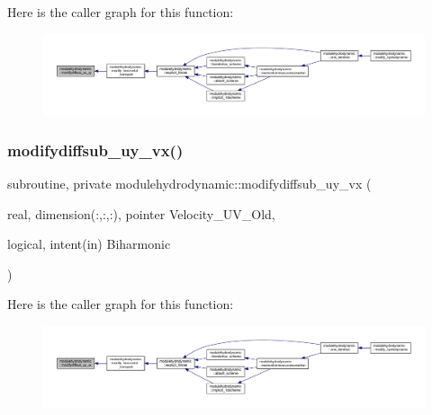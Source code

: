 Here is the caller graph for this function\+:\nopagebreak
\begin{figure}[H]
\begin{center}
\leavevmode
\includegraphics[width=350pt]{namespacemodulehydrodynamic_a0a591d70830b196d88bbd8d05d6c86f9_icgraph}
\end{center}
\end{figure}
\mbox{\label{namespacemodulehydrodynamic_aa24ecffdbf571df45437d89566a622ae}} 
\subsubsection{\texorpdfstring{modifydiffsub\+\_\+uy\+\_\+vx()}{modifydiffsub\_uy\_vx()}}
{\footnotesize\ttfamily subroutine, private modulehydrodynamic\+::modifydiffsub\+\_\+uy\+\_\+vx (\begin{DoxyParamCaption}\item[{real, dimension(\+:,\+:,\+:), pointer}]{Velocity\+\_\+\+U\+V\+\_\+\+Old,  }\item[{logical, intent(in)}]{Biharmonic }\end{DoxyParamCaption})\hspace{0.3cm}{\ttfamily [private]}}

Here is the caller graph for this function\+:\nopagebreak
\begin{figure}[H]
\begin{center}
\leavevmode
\includegraphics[width=350pt]{namespacemodulehydrodynamic_aa24ecffdbf571df45437d89566a622ae_icgraph}
\end{center}
\end{figure}
\mbox{\label{namespacemodulehydrodynamic_a855667e612812156b0ef3370781b2665}} 
